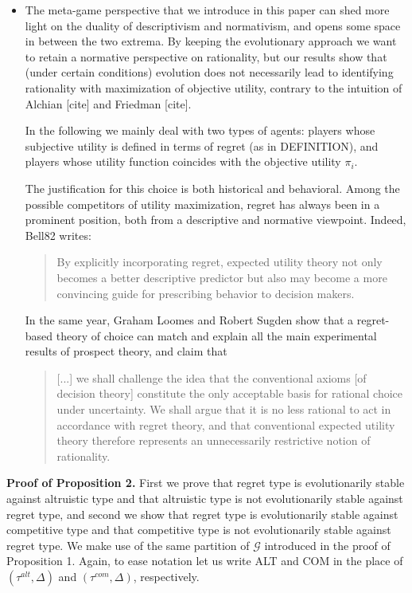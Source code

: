 \documentclass[fleqn,reqno,11pt]{article}
\begin{document}
\begin{itemize}
\item The meta-game perspective that we introduce in this paper can shed more light on the duality of descriptivism and normativism, and opens
some space in between the two extrema. 
By keeping the evolutionary approach we want to retain a
normative perspective on rationality, but our results show that (under certain conditions)
evolution does not necessarily lead to identifying rationality with maximization of objective
utility, contrary to the intuition of Alchian [cite] and Friedman [cite].

In the following we mainly deal with two types of agents: players whose subjective utility is defined
in terms of regret (as in DEFINITION), and players whose utility
function coincides with the objective utility $\pi_i$. 

The justification for this choice is both historical and behavioral. Among
the possible competitors of utility maximization, regret has always been in a prominent
position, both from a descriptive and normative viewpoint. Indeed, Bell82 writes:
\begin{quote}
  By explicitly incorporating regret, expected utility theory not only becomes a better
  descriptive predictor but also may become a more convincing guide for prescribing behavior to
  decision makers.
\end{quote}
In the same year, Graham Loomes and Robert Sugden \citet{loosug82} show that a regret-based theory of choice can match
and explain all the main experimental results of prospect theory, and claim that
\begin{quote} [...] we shall challenge the idea that the conventional axioms [of decision
  theory] constitute the only acceptable basis for rational choice under uncertainty. We shall
  argue that it is no less rational to act in accordance with regret theory, and that
  conventional expected utility theory therefore represents an unnecessarily restrictive notion
  of rationality. \hfill \citep{loosug82}
\end{quote}
\end{itemize}

\newpage

\textbf{Proof of Proposition 2.} First we prove that regret type is evolutionarily stable against altruistic type and that altruistic type is not evolutionarily stable against regret type, and second we show that regret type is evolutionarily stable against competitive type and that competitive type is not evolutionarily stable against regret type. We make use of the same partition of $\mathcal{G}$ introduced in the proof of Proposition 1. Again, to ease notation let us write ALT and COM in the place of $(\tau^{alt}, \Delta)$ and $(\tau^{com}, \Delta)$, respectively.
\end{document}
